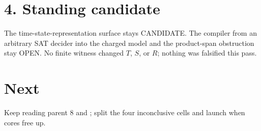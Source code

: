 \documentclass[11pt]{article}
\begin{document}
\section*{4. Standing candidate}
The time-state-representation surface stays CANDIDATE. The compiler from an arbitrary SAT decider into the charged model and the product-span obstruction stay OPEN. No finite witness changed $T$, $S$, or $R$; nothing was falsified this pass.

\section*{Next}
Keep reading parent 8 and ; split the four inconclusive cells and launch  when cores free up.
\end{document}
